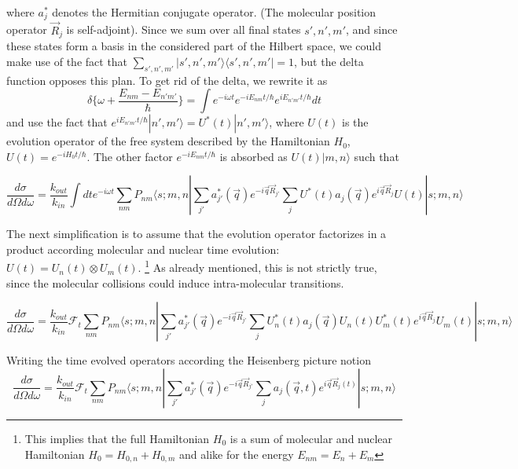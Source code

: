 \documentclass[11pt,a4paper]{article}
\begin{document}
where $a_j^{*}$ denotes the Hermitian conjugate operator. (The molecular position operator $\vec R_j$ is self-adjoint).
Since we sum over all final states $s',n',m'$, and since these states form a basis in the considered part of the Hilbert space,
we could make use of the fact that $\sum_{s', n',m' }| s', n', m'  \rangle \langle s', n' , m' |= 1$, but the
delta function opposes this plan. To get rid of the delta, we rewrite it as
\begin{equation}
\delta \bigl\{ \omega + \frac{ E_{nm} - E_{n'm'} } {\hbar} \bigr\} =
\int e^{- i \omega t} e^{- iE_{nm} t / \hbar} e^{i E_{n'm'}t / \hbar} dt
\end{equation}
and use the fact that $e^{iE_{n'm'} t / \hbar} |n',m' \rangle = U^*(t) |n',m' \rangle$, where $U(t) $ is the evolution operator of the free 
system described by the Hamiltonian $H_0$, $U(t) = e^{- i H_0 t / \hbar}$.
The other factor $e^{-iE_{nm} t / \hbar}$ is absorbed as $U(t) |m, n \rangle $ such that

\begin{equation}
\frac{d \sigma}{ d \Omega d \omega} =
\frac{k_{out}}{k_{in}}
\int d t e^{-i\omega t}
\sum_{nm}  P_{nm} 
\langle s; m, n | 
\sum_{j'} a_{j'}^{*} (\vec q) e^{-i \vec q \vec R_{j'}} 
\sum_{j} U^*(t) a_j (\vec q) e^{i \vec q \vec R_j}   
 U (t) | s; m, n \rangle
\end{equation}

The next simplification is to assume that the evolution operator factorizes in a product according molecular and nuclear
time evolution: $U(t) = U_n(t) \otimes U_m(t)$. \footnote{This implies that the full Hamiltonian $H_0$ is a sum of molecular
and nuclear Hamiltonian $H_0= H_{0, n} + H_{0, m}$ and alike for the energy $E_{nm}= E_n + E_m$}
As already mentioned, this is not strictly true, since the molecular collisions could induce intra-molecular transitions.

\begin{equation}
\frac{d \sigma}{ d \Omega d \omega} =
\frac{k_{out}}{k_{in}}
\mathcal{F}_t
\sum_{nm}  P_{nm}
\langle s; m, n | 
\sum_{j'} a_{j'}^{*}(\vec q) e^{-i \vec q \vec R_{j'}} 
\sum_{j} U_n^*(t)a_j(\vec q) U_n(t) U_m^*(t)e^{i \vec q \vec R_j}  U_m (t)  
| s; m, n \rangle
\end{equation}

Writing the time evolved operators according the Heisenberg picture notion
\begin{equation}
\frac{d \sigma}{ d \Omega d \omega} =
\frac{k_{out}}{k_{in}}
\mathcal{F}_t
\sum_{nm}  P_{nm} 
\langle s; m, n | 
\sum_{j'} a_{j'}^{*} (\vec q) e^{-i \vec q \vec R_{j'}} 
\sum_{j}a_j (\vec q, t) e^{i \vec q \vec R_j(t)}   
| s; m, n \rangle
\end{equation}
\end{document}
